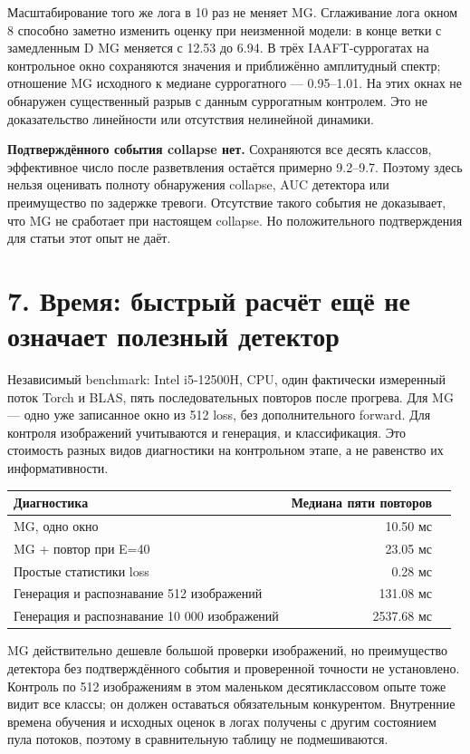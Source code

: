 \documentclass[10pt,a4paper]{article}
\begin{document}
Масштабирование того же лога в 10 раз не меняет MG. Сглаживание лога окном 8 способно заметно изменить оценку при неизменной модели: в конце ветки с замедленным D MG меняется с 12.53 до 6.94. В трёх IAAFT-суррогатах на контрольное окно сохраняются значения и приближённо амплитудный спектр; отношение MG исходного к медиане суррогатного --- 0.95--1.01. На этих окнах не обнаружен существенный разрыв с данным суррогатным контролем. Это не доказательство линейности или отсутствия нелинейной динамики.

\textbf{Подтверждённого события collapse нет.} Сохраняются все десять классов, эффективное число после разветвления остаётся примерно 9.2--9.7. Поэтому здесь нельзя оценивать полноту обнаружения collapse, AUC детектора или преимущество по задержке тревоги. Отсутствие такого события не доказывает, что MG не сработает при настоящем collapse. Но положительного подтверждения для статьи этот опыт не даёт.

\section*{7. Время: быстрый расчёт ещё не означает полезный детектор}

Независимый benchmark: Intel i5-12500H, CPU, один фактически измеренный поток Torch и BLAS, пять последовательных повторов после прогрева. Для MG --- одно уже записанное окно из 512 loss, без дополнительного forward. Для контроля изображений учитываются и генерация, и классификация. Это стоимость разных видов диагностики на контрольном этапе, а не равенство их информативности.

\begin{center}\small
\begin{tabularx}{\linewidth}{>{\raggedright\arraybackslash}Xrr}
\toprule
Диагностика & Медиана пяти повторов \\
\midrule
MG, одно окно & 10.50 мс \\
MG + повтор при E=40 & 23.05 мс \\
Простые статистики loss & 0.28 мс \\
Генерация и распознавание 512 изображений & 131.08 мс \\
Генерация и распознавание 10 000 изображений & 2537.68 мс \\
\bottomrule\end{tabularx}\end{center}

MG действительно дешевле большой проверки изображений, но преимущество детектора без подтверждённого события и проверенной точности не установлено. Контроль по 512 изображениям в этом маленьком десятиклассовом опыте тоже видит все классы; он должен оставаться обязательным конкурентом. Внутренние времена обучения и исходных оценок в логах получены с другим состоянием пула потоков, поэтому в сравнительную таблицу не подмешиваются.
\end{document}
